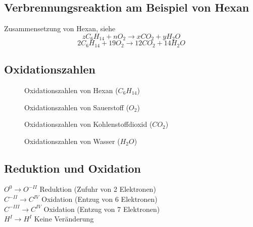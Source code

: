 \documentclass[11pt,paper=a4,final]{scrartcl}
\begin{document}
\subsection{Verbrennungsreaktion am Beispiel von Hexan}
Zusammensetzung von Hexan, siehe \cite{wiki:hexan}
\[zC_6H_{14} + nO_2 \to xCO_2 + yH_2O \]
\[2C_6H_{14} + 19O_2 \to 12CO_2 + 14H_2O \]
\newpage
\subsection{Oxidationszahlen}
\begin{figure}[h!]
  \centering
  \caption{Oxidationszahlen von Hexan (\(C_6H_{14}\))}
  \label{fig:}
\end{figure}
\begin{figure}[h!]
  \centering
  \caption{Oxidationszahlen von Sauerstoff (\(O_2\))}
  \label{fig:}
\end{figure}
\begin{figure}[h!]
  \centering
  \caption{Oxidationszahlen von Kohlenstoffdioxid (\(CO_2\))}
  \label{fig:}
\end{figure}
\begin{figure}[h!]
  \centering
  \caption{Oxidationszahlen von Wasser (\(H_2O\))}
  \label{fig:}
\end{figure}
\subsection{Reduktion und Oxidation}
\(O^0 \to O^{-II} \) Reduktion (Zufuhr von 2 Elektronen) \\
\(C^{-II} \to C^{IV} \) Oxidation (Entzug von 6 Elektronen) \\
\(C^{-III} \to C^{IV} \) Oxidation (Entzug von 7 Elektronen) \\
\(H^I \to H^I \) Keine Ver\"anderung
\end{document}
